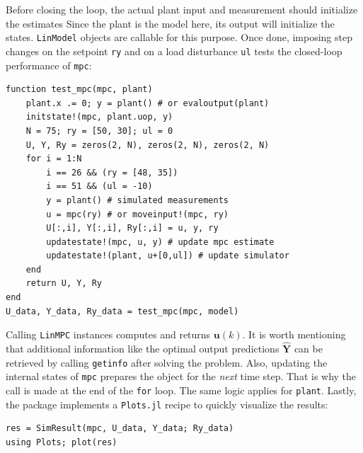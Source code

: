 Before closing the loop, the actual plant input and measurement should initialize the estimates  Since the plant is the model here, its output will initialize the states. \texttt{LinModel} objects are callable for this purpose. Once done, imposing step changes on the setpoint \texttt{ry} and on a load disturbance \texttt{ul} tests the closed-loop performance of \texttt{mpc}:
\begin{verbatim}
function test_mpc(mpc, plant)
    plant.x .= 0; y = plant() # or evaloutput(plant)
    initstate!(mpc, plant.uop, y)
    N = 75; ry = [50, 30]; ul = 0
    U, Y, Ry = zeros(2, N), zeros(2, N), zeros(2, N)
    for i = 1:N
        i == 26 && (ry = [48, 35])
        i == 51 && (ul = -10)
        y = plant() # simulated measurements
        u = mpc(ry) # or moveinput!(mpc, ry)
        U[:,i], Y[:,i], Ry[:,i] = u, y, ry
        updatestate!(mpc, u, y) # update mpc estimate
        updatestate!(plant, u+[0,ul]) # update simulator
    end
    return U, Y, Ry
end
U_data, Y_data, Ry_data = test_mpc(mpc, model)
\end{verbatim}
Calling \texttt{LinMPC} instances computes and returns $\mathbf{u}(k)$. It is worth mentioning that additional information like the optimal output predictions $\mathbf{\hat{Y}}$ can be retrieved by calling \texttt{getinfo} after solving the problem. Also, updating the internal states of \texttt{mpc} prepares the object for the \emph{next} time step. That is why the call is made at the end of the \texttt{for} loop. The same logic applies for \texttt{plant}. Lastly, the package implements a \texttt{Plots.jl} recipe \citep{plots} to quickly visualize the results:
\begin{verbatim}
res = SimResult(mpc, U_data, Y_data; Ry_data)
using Plots; plot(res)
\end{verbatim}

